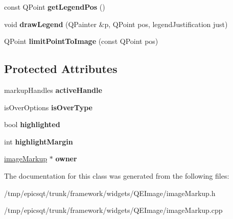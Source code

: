\begin{DoxyCompactItemize}
\item 
\hypertarget{classmarkupItem_aa7e6db35110f137f434f4c079026f0ac}{
const QPoint {\bfseries getLegendPos} ()}
\label{classmarkupItem_aa7e6db35110f137f434f4c079026f0ac}

\item 
\hypertarget{classmarkupItem_af7eafe469905f735d321b33c3bb43ba7}{
void {\bfseries drawLegend} (QPainter \&p, QPoint pos, legendJustification just)}
\label{classmarkupItem_af7eafe469905f735d321b33c3bb43ba7}

\item 
\hypertarget{classmarkupItem_a17e3a0d799b1bc94d7ad1f23c1382487}{
QPoint {\bfseries limitPointToImage} (const QPoint pos)}
\label{classmarkupItem_a17e3a0d799b1bc94d7ad1f23c1382487}

\end{DoxyCompactItemize}
\subsection*{Protected Attributes}
\begin{DoxyCompactItemize}
\item 
\hypertarget{classmarkupItem_a03c7828d130874f61f5c2e116d3deccd}{
markupHandles {\bfseries activeHandle}}
\label{classmarkupItem_a03c7828d130874f61f5c2e116d3deccd}

\item 
\hypertarget{classmarkupItem_a1d3fdc2646c70ea94203ac87110759b4}{
isOverOptions {\bfseries isOverType}}
\label{classmarkupItem_a1d3fdc2646c70ea94203ac87110759b4}

\item 
\hypertarget{classmarkupItem_a1663dc4c7b30838096f7fe5c64c3c718}{
bool {\bfseries highlighted}}
\label{classmarkupItem_a1663dc4c7b30838096f7fe5c64c3c718}

\item 
\hypertarget{classmarkupItem_afebaac631d27bf70714d5a69d4a01fbb}{
int {\bfseries highlightMargin}}
\label{classmarkupItem_afebaac631d27bf70714d5a69d4a01fbb}

\item 
\hypertarget{classmarkupItem_a4b1515d5a7ac8d1081262303d13bcdd3}{
\hyperlink{classimageMarkup}{imageMarkup} $\ast$ {\bfseries owner}}
\label{classmarkupItem_a4b1515d5a7ac8d1081262303d13bcdd3}

\end{DoxyCompactItemize}


The documentation for this class was generated from the following files:\begin{DoxyCompactItemize}
\item 
/tmp/epicsqt/trunk/framework/widgets/QEImage/imageMarkup.h\item 
/tmp/epicsqt/trunk/framework/widgets/QEImage/imageMarkup.cpp\end{DoxyCompactItemize}
